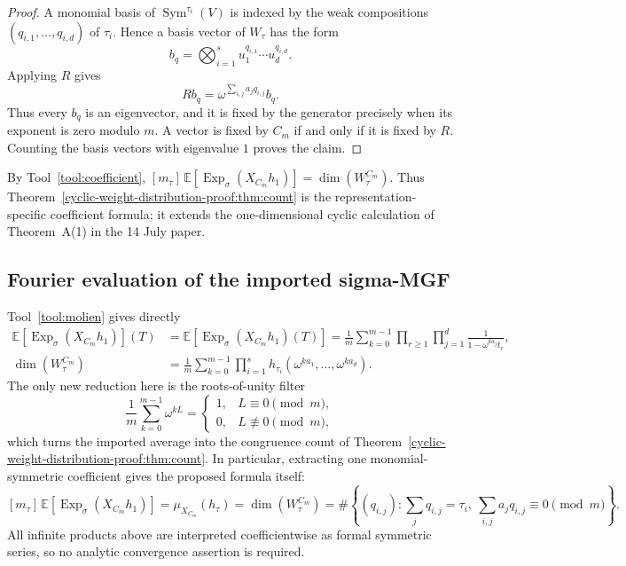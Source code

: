 \documentclass[10pt]{article}
\newcommand{\Sym}{\operatorname{Sym}}
\newcommand{\ExpS}{\operatorname{Exp}_{\sigma}}
\newcommand{\smg}[1]{\mathbb E\!\left[\ExpS\!\left(X_{#1}h_1\right)\right]}
\begin{document}
\begin{proof}
A monomial basis of $\Sym^{\tau_i}(V)$ is indexed by the weak compositions
$(q_{i,1},\ldots,q_{i,d})$ of $\tau_i$. Hence a basis vector of $W_\tau$ has
the form
\[
  b_q=\bigotimes_{i=1}^{s}u_1^{q_{i,1}}\cdots u_d^{q_{i,d}}.
\]
Applying $R$ gives
\[
  Rb_q
  =\omega^{\sum_{i,j}a_jq_{i,j}}b_q.
\]
Thus every $b_q$ is an eigenvector, and it is fixed by the generator precisely
when its exponent is zero modulo $m$. A vector is fixed by $C_m$ if and only if
it is fixed by $R$. Counting the basis vectors with eigenvalue $1$ proves the
claim.
\end{proof}

By Tool~\ref{tool:coefficient},
$[m_\tau]\,\smg{C_m}=\dim(W_\tau^{C_m})$.  Thus
Theorem~\ref{cyclic-weight-distribution-proof:thm:count} is the
representation-specific coefficient formula; it extends the one-dimensional
cyclic calculation of Theorem~A(1) in the 14 July paper.

\subsection{Fourier evaluation of the imported sigma-MGF}

Tool~\ref{tool:molien} gives directly
\begin{align}
 \smg{C_m}(T)
 &=\mathbb E\!\left[\operatorname{Exp}_{\sigma}
 (X_{C_m}h_1)(T)\right]
 =\frac1m\sum_{k=0}^{m-1}
  \prod_{r\geq1}\prod_{j=1}^{d}
  \frac{1}{1-\omega^{ka_j}t_r},
 \label{cyclic-weight-distribution-proof:eq:sigma-mgf}\\
 \dim(W_\tau^{C_m})
 &=\frac1m\sum_{k=0}^{m-1}
   \prod_{i=1}^{s}h_{\tau_i}
   (\omega^{ka_1},\ldots,\omega^{ka_d}).
 \label{cyclic-weight-distribution-proof:eq:molien-coeff}
\end{align}
The only new reduction here is the roots-of-unity filter
\[
 \frac1m\sum_{k=0}^{m-1}\omega^{kL}
 =\begin{cases}1,&L\equiv0\pmod m,\\0,&L\not\equiv0\pmod m,\end{cases}
\]
which turns the imported average into the congruence count of
Theorem~\ref{cyclic-weight-distribution-proof:thm:count}.
In particular, extracting one monomial-symmetric coefficient gives the proposed
formula itself:
\[
\boxed{
[m_\tau]\,\smg{C_m}
=\mu_{X_{C_m}}(h_\tau)
=\dim(W_\tau^{C_m})
=\#\left\{(q_{i,j}):
\sum_jq_{i,j}=\tau_i,\ 
\sum_{i,j}a_jq_{i,j}\equiv0\pmod m
\right\}.
}
\]
All infinite products above are interpreted coefficientwise as formal symmetric
series, so no analytic convergence assertion is required.
\end{document}

